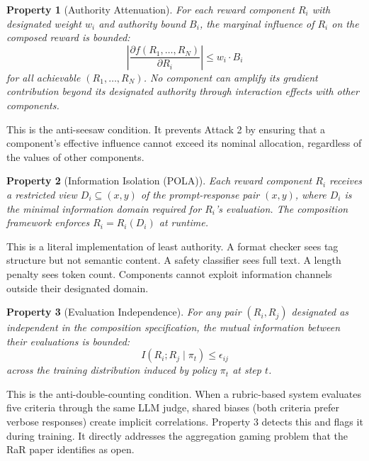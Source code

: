 \documentclass[11pt,a4paper]{article}
\newtheorem{property}{Property}
\begin{document}
\begin{property}[Authority Attenuation]
For each reward component $R_i$ with designated weight $w_i$ and authority bound $B_i$, the marginal influence of $R_i$ on the composed reward is bounded:
\begin{equation}
\left|\frac{\partial f(R_1, \ldots, R_N)}{\partial R_i}\right| \leq w_i \cdot B_i
\end{equation}
for all achievable $(R_1, \ldots, R_N)$. No component can amplify its gradient contribution beyond its designated authority through interaction effects with other components.
\end{property}

This is the anti-seesaw condition. It prevents Attack 2 by ensuring that a component's effective influence cannot exceed its nominal allocation, regardless of the values of other components.

\begin{property}[Information Isolation (POLA)]
Each reward component $R_i$ receives a restricted view $D_i \subseteq (x, y)$ of the prompt-response pair $(x, y)$, where $D_i$ is the minimal information domain required for $R_i$'s evaluation. The composition framework enforces $R_i = R_i(D_i)$ at runtime.
\end{property}

This is a literal implementation of least authority. A format checker sees tag structure but not semantic content. A safety classifier sees full text. A length penalty sees token count. Components cannot exploit information channels outside their designated domain.

\begin{property}[Evaluation Independence]
For any pair $(R_i, R_j)$ designated as independent in the composition specification, the mutual information between their evaluations is bounded:
\begin{equation}
I(R_i; R_j \mid \pi_t) \leq \epsilon_{ij}
\end{equation}
across the training distribution induced by policy $\pi_t$ at step $t$.
\end{property}

This is the anti-double-counting condition. When a rubric-based system evaluates five criteria through the same LLM judge, shared biases (both criteria prefer verbose responses) create implicit correlations. Property 3 detects this and flags it during training. It directly addresses the aggregation gaming problem that the RaR paper \cite{rar2026} identifies as open.
\end{document}
